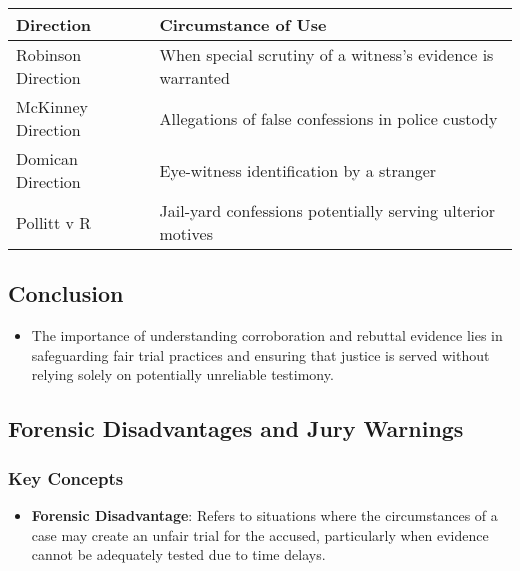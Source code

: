 \begin{longtable}[]{@{}
  >{\raggedright\arraybackslash}p{}
  >{\raggedright\arraybackslash}p{}@{}}
\toprule\noalign{}
\begin{minipage}[b]{\linewidth}\raggedright
Direction
\end{minipage} & \begin{minipage}[b]{\linewidth}\raggedright
Circumstance of Use
\end{minipage} \\
\midrule\noalign{}
\endhead
\bottomrule\noalign{}
\endlastfoot
Robinson Direction & When special scrutiny of a witness's evidence is
warranted \\
McKinney Direction & Allegations of false confessions in police
custody \\
Domican Direction & Eye-witness identification by a stranger \\
Pollitt v R & Jail-yard confessions potentially serving ulterior
motives \\
\end{longtable}

\subsection{  Conclusion}\label{conclusion}

\begin{itemize}
\tightlist
\item
  The importance of understanding corroboration and rebuttal evidence
  lies in safeguarding fair trial practices and ensuring that justice is
  served without relying solely on potentially unreliable testimony.
\end{itemize}

\subsection{  Forensic Disadvantages and Jury
Warnings}\label{forensic-disadvantages-and-jury-warnings}

\subsubsection{Key Concepts}\label{key-concepts}

\begin{itemize}
\tightlist
\item
  \textbf{Forensic Disadvantage}: Refers to situations where the
  circumstances of a case may create an unfair trial for the accused,
  particularly when evidence cannot be adequately tested due to time
  delays.
\end{itemize}

